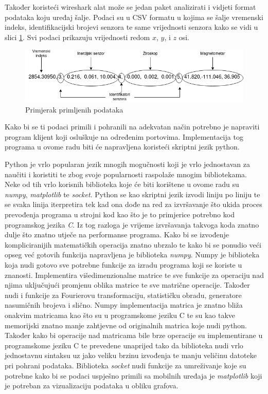 \documentclass[times, utf8, diplomski]{fer}
\begin{document}
Također koristeći wireshark alat može se jedan paket analizirati i vidjeti format podataka koju uređaj šalje. Podaci su u CSV formatu u kojima se šalje vremenski indeks,
identifikacijski brojevi senzora te same vrijednosti senzora kako se vidi u slici \ref{datagram}. Svi podaci prikazuju vrijednosti redom $x$, $y$, i $z$ osi.

\begin{figure}[h]
    \includegraphics[width=\textwidth]{datagram.png}
    \caption{Primjerak primljenih podataka}
    \label{datagram}
\end{figure}

Kako bi se ti podaci primili i pohranili na adekvatan način potrebno je napraviti program klijent koji osluškuje na određenim portovima. Implementacija tog programa 
u ovome radu biti će napravljena koristeći skriptni jezik python. 

Python je vrlo popularan jezik mnogih mogučnosti koji je vrlo jednostavan za naučiti i koristiti te zbog svoje popularnosti raspolaže mnogim bibliotekama.
Neke od tih vrlo korisnih biblioteka koje će biti korištene u ovome radu su \textit{numpy}, \textit{matplotlib} te \textit{socket}. Python se kao skriptni jezik
izvodi liniju po liniju te se svaka linija iterpretira tek kad ona dođe na red za izvršavanje što ukida proces prevođenja programa u strojni kod kao što je to primjerice
potrebno kod programskog jezika \textit{C}. Iz tog razloga je vrijeme izvršavanja takvoga koda znatno dulje što znatno utječe na performanse programa. Kako bi se
izvođenje kompliciranijih matematičkih operacija znatno ubrzalo te kako bi se ponudio veći opseg već gotovih funkcija napravljena je biblioteka \textit{numpy}.
Numpy je biblioteka koja nudi gotovo sve potrebne funkcije za izradu programa koji se koriste u znanosti. Implementira višedimenzionalne matrice te sve funkcije
za operaciju nad njima uključujući promjenu oblika matrice te sve matrične operacije. Također nudi i funkcije za Fourierovu transformaciju, statističku obradu,
generatore nasumičnih brojeva i slično. Numpy implementacija matrica je znatno bliža onakvim matricama kao što su u programskome jeziku C te su kao takve memorijski
znatno manje zahtjevne od originalnih matrica koje nudi python. Također kako bi operacije nad matricama bile brze operacije su implementirane u programskome jeziku C te
prevedene unaprijed tako da biblioteka nudi vrlo jednostavnu sintaksu uz jako veliku brzinu izvođenja te manju veličinu datoteke pri pohrani podataka.
Biblioteka \textit{socket} nudi funkcije za umreživanje koje su potrebne kako bi se podaci uspješno primili sa mobilnih uređaja je \textit{matplotlib} koji je potreban
za vizualizaciju podataka u obliku grafova.
\end{document}
